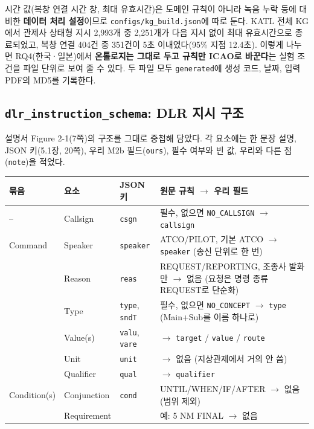 \documentclass[10pt,a4paper]{article}
\newcommand{\cmd}[1]{\textsf{\small #1}}
\newcommand{\key}[1]{\texttt{\small #1}}
\begin{document}
\noindent 시간 값(복창 연결 시간 창, 최대 유효시간)은 도메인 규칙이 아니라 녹음 누락 등에 대비한 \textbf{데이터 처리 설정}이므로 \texttt{configs/kg\_build.json}에 따로 둔다. KATL 전체 KG에서 관제사 상태형 지시 2{,}993개 중 2{,}251개가 다음 지시 없이 최대 유효시간으로 종료되었고, 복창 연결 404건 중 351건이 5초 이내였다(95\% 지점 12.4초). 이렇게 나누면 RQ4(한국·일본)에서 \textbf{온톨로지는 그대로 두고 규칙만 ICAO로 바꾼다}는 실험 조건을 파일 단위로 보여 줄 수 있다. 두 파일 모두 \key{generated}에 생성 코드, 날짜, 입력 PDF의 MD5를 기록한다.

\subsection*{\texttt{dlr\_instruction\_schema}: DLR 지시 구조}
설명서 Figure 2-1(7쪽)의 구조를 그대로 중첩해 담았다. 각 요소에는 한 문장 설명, JSON 키(5.1장, 20쪽), 우리 M2b 필드(\key{ours}), 필수 여부와 빈 값, 우리와 다른 점(\key{note})을 적었다.
\begin{center}\small
\begin{tabularx}{\textwidth}{@{}ll l>{\raggedright\arraybackslash}X@{}}
\toprule
묶음 & 요소 & JSON 키 & 원문 규칙 $\to$ 우리 필드\\\midrule
-- & Callsign & \key{csgn} & 필수, 없으면 \texttt{NO\_CALLSIGN} $\to$ \key{callsign}\\
Command & Speaker & \key{speaker} & ATCO/PILOT, 기본 ATCO $\to$ \key{speaker} (송신 단위로 한 번)\\
 & Reason & \key{reas} & REQUEST/REPORTING, 조종사 발화만 $\to$ 없음 (요청은 명령 종류 \cmd{REQUEST}로 단순화)\\
 & Type & \key{type}, \key{sndT} & 필수, 없으면 \texttt{NO\_CONCEPT} $\to$ \key{type} (Main+Sub를 이름 하나로)\\
 & Value(s) & \key{valu}, \key{vare} & $\to$ \key{target} / \key{value} / \key{route}\\
 & Unit & \key{unit} & $\to$ 없음 (지상관제에서 거의 안 씀)\\
 & Qualifier & \key{qual} & $\to$ \key{qualifier}\\
Condition(s) & Conjunction & \key{cond} & UNTIL/WHEN/IF/AFTER $\to$ 없음 (범위 제외)\\
 & Requirement & & 예: 5 NM FINAL $\to$ 없음\\
\bottomrule
\end{tabularx}
\end{center}
\end{document}

